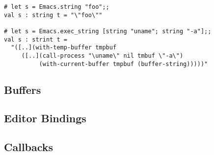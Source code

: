 \begin{verbatim}
# let s = Emacs.string "foo";;
val s : string t = "\"foo\""

# let s = Emacs.exec_string [string "uname"; string "-a"];;
val s : strint t =
  "([..](with-temp-buffer tmpbuf
     ([..](call-process "\uname\" nil tmbuf \"-a\")
          (with-current-buffer tmpbuf (buffer-string)))))"
\end{verbatim}

\subsection{Buffers}

\subsection{Editor Bindings}

\subsection{Callbacks}
